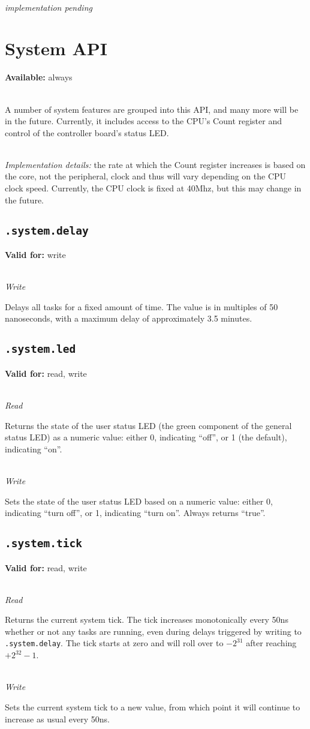\documentclass{article}
\begin{document}
~\\
\textit{implementation pending}

\section{System API}
\textbf{Available:} always

~\\
A number of system features are grouped into this API, and many more will be in the future. Currently, it includes access to the CPU's Count register and control of the controller board's status LED.

~\\
\textit{Implementation details:} the rate at which the Count register increases is based on the core, not the peripheral, clock and thus will vary depending on the CPU clock speed.
Currently, the CPU clock is fixed at 40Mhz, but this may change in the future.

\subsection{\texttt{.system.delay}}
\textbf{Valid for:} write

~\\
\textit{Write}

Delays all tasks for a fixed amount of time. The value is in multiples of 50 nanoseconds, with a maximum delay of approximately 3.5 minutes.

\subsection{\texttt{.system.led}}
\textbf{Valid for:} read, write

~\\
\textit{Read}

Returns the state of the user status LED (the green component of the general status LED) as a numeric value: either 0, indicating ``off'', or 1 (the default), indicating ``on''.

~\\
\textit{Write}

Sets the state of the user status LED based on a numeric value: either 0, indicating ``turn off'', or 1, indicating ``turn on''. Always returns ``true''.

\subsection{\texttt{.system.tick}}
\textbf{Valid for:} read, write

~\\
\textit{Read}

Returns the current system tick. The tick increases monotonically every 50ns whether or not any tasks are running, even during delays triggered by writing to \texttt{.system.delay}. The tick starts at zero and will roll over to $-2^{31}$ after reaching $+2^{32}-1$.

~\\
\textit{Write}

Sets the current system tick to a new value, from which point it will continue to increase as usual every 50ns.
\end{document}
